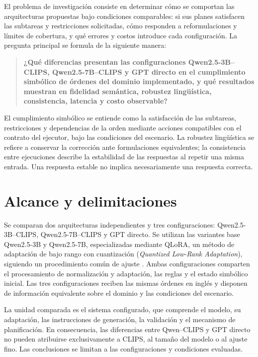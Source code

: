 El problema de investigación consiste en determinar cómo se comportan las arquitecturas propuestas bajo condiciones comparables: si sus planes satisfacen las subtareas y restricciones solicitadas, cómo responden a reformulaciones y límites de cobertura, y qué errores y costos introduce cada configuración. La pregunta principal se formula de la siguiente manera:

\begin{quote}
\textbf{¿Qué diferencias presentan las configuraciones Qwen2.5-3B--CLIPS, Qwen2.5-7B--CLIPS y GPT directo en el cumplimiento simbólico de órdenes del dominio implementado, y qué resultados muestran en fidelidad semántica, robustez lingüística, consistencia, latencia y costo observable?}
\end{quote}

El cumplimiento simbólico se entiende como la satisfacción de las subtareas, restricciones y dependencias de la orden mediante acciones compatibles con el contrato del ejecutor, bajo las condiciones del escenario. La robustez lingüística se refiere a conservar la corrección ante formulaciones equivalentes; la consistencia entre ejecuciones describe la estabilidad de las respuestas al repetir una misma entrada. Una respuesta estable no implica necesariamente una respuesta correcta.

\section{Alcance y delimitaciones}

Se comparan dos arquitecturas independientes y tres configuraciones: Qwen2.5-3B--CLIPS, Qwen2.5-7B--CLIPS y GPT directo. Se utilizan las variantes base Qwen2.5-3B y Qwen2.5-7B, especializadas mediante QLoRA, un método de adaptación de bajo rango con cuantización (\textit{Quantized Low-Rank Adaptation}), siguiendo un procedimiento común de ajuste \cite{dettmers2023qlora}. Ambas configuraciones comparten el procesamiento de normalización y adaptación, las reglas y el estado simbólico inicial. Las tres configuraciones reciben las mismas órdenes en inglés y disponen de información equivalente sobre el dominio y las condiciones del escenario.

La unidad comparada es el sistema configurado, que comprende el modelo, su adaptación, las instrucciones de generación, la validación y el mecanismo de planificación. En consecuencia, las diferencias entre Qwen--CLIPS y GPT directo no pueden atribuirse exclusivamente a CLIPS, al tamaño del modelo o al ajuste fino. Las conclusiones se limitan a las configuraciones y condiciones evaluadas.

